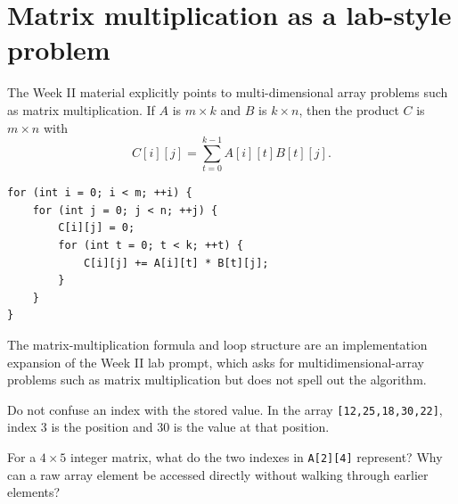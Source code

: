 \section{Matrix multiplication as a lab-style problem}

The Week II material explicitly points to multi-dimensional array problems such as matrix multiplication. If $A$ is $m\times k$ and $B$ is $k\times n$, then the product $C$ is $m\times n$ with
\[
C[i][j] = \sum_{t=0}^{k-1} A[i][t]B[t][j].
\]

\begin{lstlisting}
for (int i = 0; i < m; ++i) {
    for (int j = 0; j < n; ++j) {
        C[i][j] = 0;
        for (int t = 0; t < k; ++t) {
            C[i][j] += A[i][t] * B[t][j];
        }
    }
}
\end{lstlisting}

\begin{clarification}
The matrix-multiplication formula and loop structure are an implementation expansion of the Week II lab prompt, which asks for multidimensional-array problems such as matrix multiplication but does not spell out the algorithm.
\end{clarification}

\begin{pitfall}
Do not confuse an index with the stored value. In the array \texttt{[12,25,18,30,22]}, index 3 is the position and 30 is the value at that position.
\end{pitfall}

\begin{quickcheck}
For a $4\times5$ integer matrix, what do the two indexes in \texttt{A[2][4]} represent? Why can a raw array element be accessed directly without walking through earlier elements?
\end{quickcheck}


